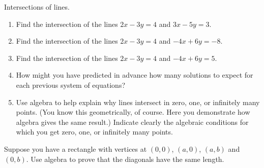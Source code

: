 \begin{prob}
Intersections of lines.  
\begin{enumerate}
\item Find the intersection of the lines $2x-3y=4$ and $3x-5y=3$.  
\item Find the intersection of the lines $2x-3y=4$ and $-4x+6y=-8$.
\item Find the intersection of the lines $2x-3y=4$ and $-4x+6y=5$.
\item How might you have predicted in advance how many solutions to expect for each previous system of equations?
\item Use algebra to help explain why lines intersect in zero, one, or infinitely many points.  (You know this geometrically, of course.  Here you demonstrate how algebra gives the same result.)  Indicate clearly the algebraic conditions
for which you get zero, one, or infinitely many points.  
\end{enumerate}
\end{prob}

\begin{prob}
Suppose you have a rectangle with vertices at $(0,0)$, $(a,0)$,
$(a,b)$ and $(0,b)$. Use algebra to prove that the diagonals have the
same length.
\end{prob}

%


